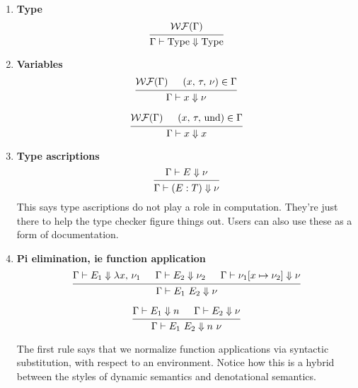 \documentclass{article}
\begin{document}
\begin{enumerate}
\item \textbf{Type}
  \[
    \begin{prooftree}
      \hypo{\wf(\Gamma)}
      \infer1{\Gamma \vdash \Type \Downarrow \Type} 
    \end{prooftree}
  \]
\item \textbf{Variables} \\
  \[
    \begin{prooftree}
      \hypo{\wf(\Gamma)}
      \hypo{(x, \, \tau, \, \nu) \in \Gamma}
      \infer2{\Gamma \vdash x \Downarrow \nu}
    \end{prooftree} 
  \]

  \[
    \begin{prooftree}
      \hypo{\wf(\Gamma)}
      \hypo{(x, \, \tau, \, \text{und}) \in \Gamma}
      \infer2{\Gamma \vdash x \Downarrow x}
    \end{prooftree} 
  \]

\item \textbf{Type ascriptions} \\
  \[
    \begin{prooftree}
      \hypo{\Gamma \vdash E \Downarrow \nu}
      \infer1{\Gamma \vdash (E : T) \Downarrow \nu}
    \end{prooftree}
  \]
  This says type ascriptions do not play a role in computation. They're just
  there to help the type checker figure things out. Users can also use these as
  a form of documentation.
 
\item \textbf{Pi elimination, ie function application} \\
  \[
    \begin{prooftree}
      \hypo{\Gamma \vdash E_1 \Downarrow \lambda x, \, \nu_1}
      \hypo{\Gamma \vdash E_2 \Downarrow \nu_2}
      \hypo{\Gamma \vdash \nu_1[x \mapsto \nu_2] \Downarrow \nu}
      \infer3{\Gamma \vdash E_1 \,\, E_2 \Downarrow \nu}
    \end{prooftree}
  \]

  \[
    \begin{prooftree}
      \hypo{\Gamma \vdash E_1 \Downarrow n}
      \hypo{\Gamma \vdash E_2 \Downarrow \nu}
      \infer2{\Gamma \vdash E_1 \,\, E_2 \Downarrow n \,\, \nu}
    \end{prooftree}
  \]

  The first rule says that we normalize function applications via syntactic
  substitution, with respect to an environment. Notice how this is a hybrid
  between the styles of dynamic semantics and denotational semantics. 


\end{enumerate}
\end{document}
